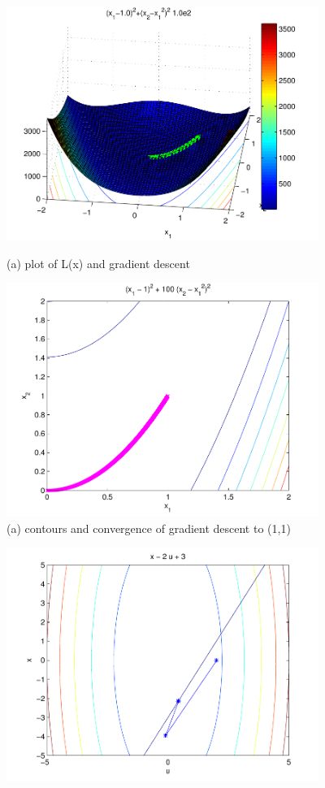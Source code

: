 \begin{enumerate}
  \begin{figure}[h!]
      \begin{minipage}{0.5\linewidth}
        \centering
	\includegraphics[width=4in, height = 3in]{pic1.pdf}
	\caption{(a) plot of L(x) and gradient descent}
      \end{minipage}
      \hspace{0.2in}
      \begin{minipage}{0.5\linewidth}
      \centering
	\includegraphics[width=4in, height=3in] {pic2.pdf}
	\caption{(a) contours and convergence of gradient descent to (1,1)}
      \end{minipage}
  \end{figure}
  \begin{figure}[h!]
      \begin{minipage}{0.5\linewidth}
        \centering
	\includegraphics[width=4in, height = 3in] {pic3.pdf}

\end{minipage}
\end{figure}
\end{enumerate}
